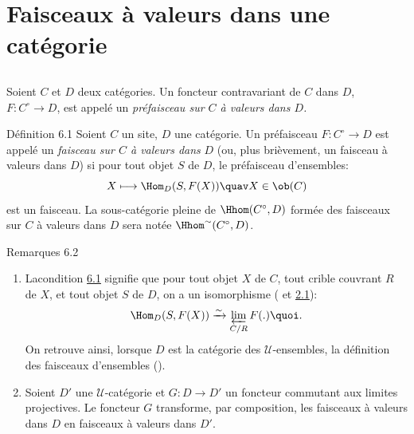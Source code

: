 \section{Faisceaux à valeurs dans une catégorie}

\setcounter{subsection}{-1}
\subsection{}
Soient $C$ et $D$ deux catégories. Un foncteur contravariant de
$C$ dans $D$, $F:C^{\circ}\rightarrow D$, est appelé un
\emph{préfaisceau sur $C$ à valeurs dans $D$.}

\begin{enonce*}{Définition 6.1}
Soient $C$ un site, $D$ une catégorie. Un préfaisceau
$F:C^{\circ}\rightarrow D$ est appelé un \emph{faisceau sur $C$ à
valeurs dans} $D$ (ou, plus brièvement, un faisceau à valeurs dans
$D$) si pour tout objet $S$ de $D$, le préfaisceau d'ensembles:
$$
X\longmapsto \Hom_D(S,F(X))\quav X\in \ob(C)
$$
est un faisceau. La sous-catégorie pleine de $\Hhom(C^{\circ},D)$
formée des faisceaux sur $C$ à valeurs dans $D$ sera notée
$\Hhom^{\sim}(C^{\circ},D)$.
\end{enonce*}

\begin{enonce*}[remark]{Remarques 6.2}
\begin{enumerate}
\renewcommand{\labelenumi}{\theenumi)}
\item La\pageoriginale condition \hyperref[II.def6.1]{6.1} signifie que pour
  tout objet $X$
  de $C$, tout crible couvrant $R$ de $X$, et tout objet $S$ de $D$,
  on a un isomorphisme ( et \hyperref[II.def2.1]{2.1}):
$$
\Hom_D(S,F(X))\xrightarrow{\sim}\varprojlim_{C/R}F(.){\quoi}.
$$
On retrouve ainsi, lorsque $D$ est la catégorie des
$𝒰$-ensembles, la définition des faisceaux d'ensembles
(\loccit).

\item Soient $D'$ une $𝒰$-catégorie et $G:D\rightarrow D'$
  un foncteur commutant aux limites projectives. Le foncteur $G$
  transforme, par composition, les faisceaux à valeurs dans $D$ en
  faisceaux à valeurs dans $D'$.
\end{enumerate}
\end{enonce*}

\setcounter{subsection}{3} \setcounter{subsubsection}{-1}
